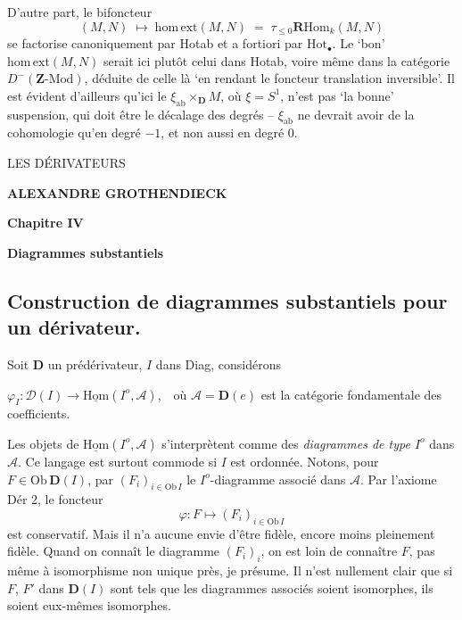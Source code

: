 \documentclass[11pt]{article}
\newcommand{\printedpage}[1]{\marginpar{\footnotesize p.~#1}}
\newcommand{\msp}[1]{\marginpar{\footnotesize [#1]}}
\newcommand{\Hot}{\mathrm{Hot}}
\newcommand{\D}{\mathbf{D}}
\newcommand{\uHom}{\underline{\mathrm{Hom}}}
\newcommand{\homext}{\mathrm{hom}\,\mathrm{ext}}
\newcommand{\RHom}{\mathbf{R}\mathrm{Hom}}
\newcommand{\ab}{\mathrm{ab}}
\newcommand{\cA}{\mathcal{A}}
\begin{document}
D’autre part, le bifoncteur
\[
(M,N)\;\longmapsto\;\homext(M,N)\;=\;\tau_{\le 0}\RHom_k(M,N)
\]
se factorise canoniquement par Hotab et a fortiori par $\Hot_{\bullet}$. Le ‘bon’ $\homext(M,N)$ serait ici plutôt celui dans Hotab, voire même dans la catégorie $D^{-}(\mathbf{Z}\text{-Mod})$, déduite de celle là ‘en rendant le foncteur translation inversible’. Il est évident d’ailleurs qu’ici le $\xi_{\ab}\times_{\D}M$, où $\xi=S^1$, n’est pas ‘la bonne’ suspension, qui doit être le décalage des degrés – $\xi_{\ab}$ ne devrait avoir de la cohomologie qu’en degré $-1$, et non aussi en degré $0$.

\clearpage

\printedpage{}%

\begin{center}
{\LARGE\textsf{LES DÉRIVATEURS}}

\bigskip

\textbf{ALEXANDRE GROTHENDIECK}

\bigskip\bigskip

\textbf{Chapitre IV}

\medskip

\textbf{Diagrammes substantiels}
\end{center}

\clearpage

\printedpage{}%


\clearpage

\printedpage{1}

\noindent

\msp{page 73}

\subsection*{Construction de diagrammes substantiels pour un dérivateur.}

\noindent Soit $\D$ un prédérivateur, $I$ dans Diag, considérons

\noindent $\varphi_I : \mathcal{D}(I) \longrightarrow \uHom(I^o,\cA)$,\ \ où $\cA=\D(e)$ est la catégorie fondamentale des coefficients. %

Les objets de $\uHom(I^o,\cA)$ s'interprètent comme des \textit{diagrammes de type $I^o$} dans $\cA$. Ce langage est surtout commode si $I$ est ordonnée. Notons, pour $F\in\mathrm{Ob}\,\D(I)$, par $(F_i)_{i\in\mathrm{Ob}\,I}$ le $I^o$-diagramme associé dans $\cA$. Par l'axiome Dér 2, le foncteur
\[
\varphi : F \longmapsto (F_i)_{i\in\mathrm{Ob}\,I}
\]
est conservatif. Mais il n'a aucune envie d'être fidèle, encore moins pleinement fidèle. Quand on connaît le diagramme $(F_i)_i$, on est loin de connaître $F$, pas même à isomorphisme non unique près, je présume. Il n'est nullement clair que si $F$, $F'$ dans $\D(I)$ sont tels que les diagrammes associés soient isomorphes, ils soient eux-mêmes isomorphes.
\end{document}
